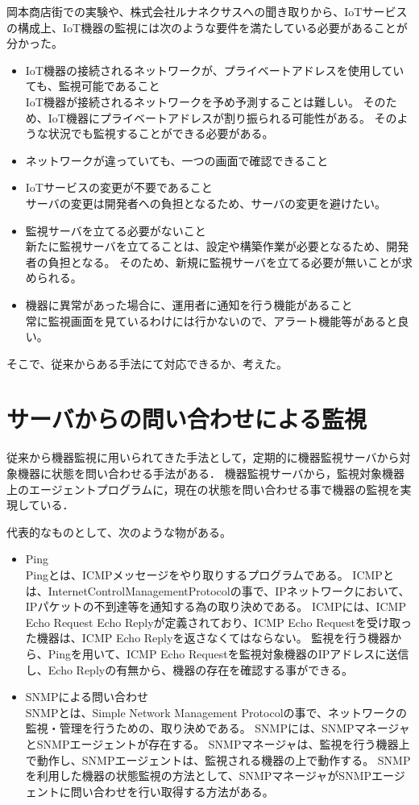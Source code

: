 岡本商店街での実験や、株式会社ルナネクサスへの聞き取りから、IoTサービスの構成上、IoT機器の監視には次のような要件を満たしている必要があることが分かった。
\begin{itemize}
\item IoT機器の接続されるネットワークが、プライベートアドレスを使用していても、監視可能であること\\
	IoT機器が接続されるネットワークを予め予測することは難しい。
	そのため、IoT機器にプライベートアドレスが割り振られる可能性がある。
	そのような状況でも監視することができる必要がある。
\item ネットワークが違っていても、一つの画面で確認できること\\
\item IoTサービスの変更が不要であること\\
	サーバの変更は開発者への負担となるため、サーバの変更を避けたい。
\item 監視サーバを立てる必要がないこと\\
	新たに監視サーバを立てることは、設定や構築作業が必要となるため、開発者の負担となる。
	そのため、新規に監視サーバを立てる必要が無いことが求められる。
\item 機器に異常があった場合に、運用者に通知を行う機能があること\\
	常に監視画面を見ているわけには行かないので、アラート機能等があると良い。
\end{itemize}

そこで、従来からある手法にて対応できるか、考えた。
\section{サーバからの問い合わせによる監視}
	従来から機器監視に用いられてきた手法として，定期的に機器監視サーバから対象機器に状態を問い合わせる手法がある．
	機器監視サーバから，監視対象機器上のエージェントプログラムに，現在の状態を問い合わせる事で機器の監視を実現している．
	\medskip

	代表的なものとして、次のような物がある。
	\begin{itemize}
		\item Ping\\
			Pingとは、ICMPメッセージをやり取りするプログラムである。
			ICMPとは、InternetControlManagementProtocolの事で、IPネットワークにおいて、IPパケットの不到達等を通知する為の取り決めである。
			ICMPには、ICMP Echo Request Echo Replyが定義されており、ICMP Echo Requestを受け取った機器は、ICMP Echo Replyを返さなくてはならない。
			監視を行う機器から、Pingを用いて、ICMP Echo Requestを監視対象機器のIPアドレスに送信し、Echo Replyの有無から、機器の存在を確認する事ができる。
		\item SNMPによる問い合わせ\\
			SNMPとは、Simple Network Management Protocolの事で、ネットワークの監視・管理を行うための、取り決めである。
			SNMPには、SNMPマネージャとSNMPエージェントが存在する。
			SNMPマネージャは、監視を行う機器上で動作し、SNMPエージェントは、監視される機器の上で動作する。
			SNMPを利用した機器の状態監視の方法として、SNMPマネージャがSNMPエージェントに問い合わせを行い取得する方法がある。
	\end{itemize}
	
